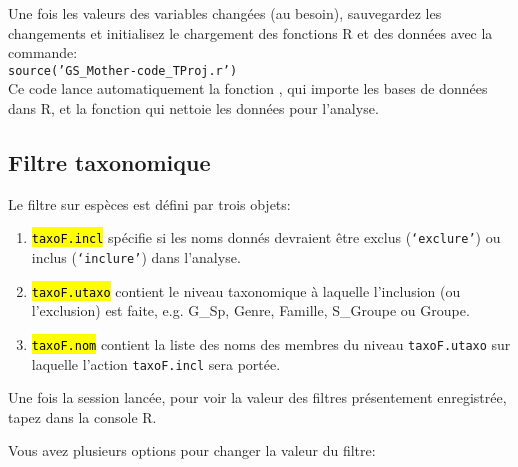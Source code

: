 \documentclass{article}
\begin{document}
Une fois les valeurs des
variables changées (au besoin), sauvegardez les changements et
initialisez le chargement des fonctions R et des données avec la commande: \\
\texttt{source('GS\_Mother-code\_TProj.r')}\\

Ce code lance automatiquement la fonction ,
qui importe les bases de données dans R, et la fonction
 qui nettoie les données pour l'analyse.

\subsection{Filtre taxonomique} \label{ftaxo}

Le filtre sur espèces est défini par trois objets:

\begin{enumerate}
  \item \hl{\texttt{taxoF.incl}} spécifie si les noms donnés devraient être
    exclus (\texttt{`exclure'}) ou inclus (\texttt{`inclure'}) dans
    l'analyse.
  \item \hl{\texttt{taxoF.utaxo}} contient le niveau taxonomique à laquelle
    l'inclusion (ou l'exclusion) est faite, e.g. G\_Sp, Genre,
    Famille, S\_Groupe ou Groupe.
   \item \hl{\texttt{taxoF.nom}} contient la liste des noms des membres du
     niveau \texttt{taxoF.utaxo} sur laquelle l'action
     \texttt{taxoF.incl} sera portée.
\end{enumerate}

Une fois la session lancée, pour voir la valeur des filtres
présentement enregistrée, tapez  dans la
console R.

Vous avez plusieurs options pour changer la valeur du filtre:
\end{document}
